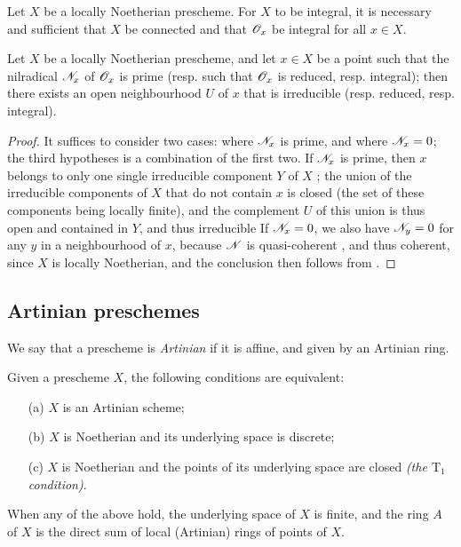 \begin{corollary}[6.1.12]
\label{I.6.1.12}
Let $X$ be a locally Noetherian prescheme.
For $X$ to be integral, it is necessary and sufficient that $X$ be connected and that $\mathscr{O}_x$ be integral for all $x\in X$.
\end{corollary}

\begin{proposition}[6.1.13]
\label{I.6.1.13}
Let $X$ be a locally Noetherian prescheme, and let $x\in X$ be a point such that the nilradical $\mathscr{N}_x$ of $\mathscr{O}_x$ is prime (resp. such that $\mathscr{O}_x$ is reduced, resp. integral);
then there exists an open neighbourhood $U$ of $x$ that is irreducible (resp. reduced, resp. integral).
\end{proposition}

\begin{proof}
\label{proof-I.6.1.13}
It suffices to consider two cases: where $\mathscr{N}_x$ is prime, and where $\mathscr{N}_x=0$; the third hypotheses is a combination of the first two.
If $\mathscr{N}_x$ is prime, then $x$ belongs to only one single irreducible component $Y$ of $X$ ;
the union of the irreducible components of $X$ that do not contain $x$ is closed (the set of these components being locally finite), and the complement $U$ of this union is thus open and contained in $Y$, and thus irreducible 
If $\mathscr{N}_x=0$, we also have $\mathscr{N}_y=0$ for any $y$ in a neighbourhood of $x$, because $\mathscr{N}$ is quasi-coherent , and thus coherent, since $X$ is locally Noetherian, and the conclusion then follows from .
\end{proof}

\subsection{Artinian preschemes}
\label{subsection:I.6.2}

\begin{definition}[6.2.1]
\label{I.6.2.1}
We say that a prescheme is \emph{Artinian} if it is affine, and given by an Artinian ring.
\end{definition}

\begin{proposition}[6.2.2]
\label{I.6.2.2}
Given
a prescheme $X$, the following conditions are equivalent:
\begin{enumerate}
  \item[{\rm(a)}] $X$ is an Artinian scheme;
  \item[{\rm(b)}] $X$ is Noetherian and its underlying space is discrete;
  \item[{\rm(c)}] $X$ is Noetherian and the points of its underlying space are closed \emph{(the $\mathrm{T}_1$ condition)}.
\end{enumerate}
When any of the above hold, the underlying space of $X$ is finite, and the ring $A$ of $X$ is the direct sum of local (Artinian) rings of points of $X$.
\end{proposition}

